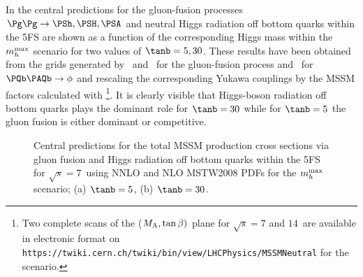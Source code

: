 In  the central predictions for the
gluon-fusion processes $\Pg\Pg\to \PSh,\PSH,\PSA$ and neutral Higgs
radiation off bottom quarks within the 5FS are shown as a function of
the corresponding Higgs mass within the $m_h^{\rm max}$ scenario for two
values of $\tanb=5,30$. These results have been obtained from the grids
generated by \gghnnlo~and \HIGLU~for the gluon-fusion process and
\bbhnnlo~for $\PQb\PAQb\to \phi$ and rescaling the corresponding Yukawa
couplings by the MSSM factors calculated with 
\FeynHiggs{}\footnote{Two complete scans of the ($M_{\mathrm{A}},\tan\beta)$ 
plane for $\sqrt{s}=7$ and $14$\UTeV\ are available in electronic format 
on {\tt https://twiki.cern.ch/twiki/bin/view/LHCPhysics/MSSMNeutral} 
for the \mhmaxx scenario.}. It is clearly
visible that Higgs-boson radiation off bottom quarks plays the dominant
role for $\tanb=30$ while for $\tanb=5$ the gluon fusion is either
dominant or competitive.
\begin{figure}[htb]
\caption{\label{YRHXS_MSSM_neutral_fig6} Central predictions for the
total MSSM production cross sections via gluon fusion and Higgs radiation off
bottom quarks within the 5FS for $\sqrt{s}=7$\UTeV\ using NNLO and NLO
MSTW2008 PDFs \cite{Martin:2009iq,Martin:2009bu} for the $m_h^{\rm max}$
scenario; (a) $\tanb=5$, (b) $\tanb=30$.}
\end{figure}

\clearpage

